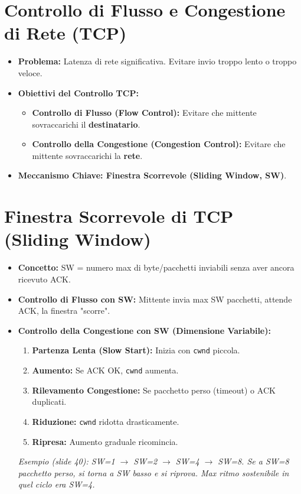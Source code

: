 \documentclass{article}
\begin{document}
\section{Controllo di Flusso e Congestione di Rete (TCP)}
\begin{itemize}
    \item \textbf{Problema:} Latenza di rete significativa. Evitare invio troppo lento o troppo veloce.
    \item \textbf{Obiettivi del Controllo TCP:}
    \begin{itemize}
        \item \textbf{Controllo di Flusso (Flow Control):} Evitare che mittente sovraccarichi il \textbf{destinatario}.
        \item \textbf{Controllo della Congestione (Congestion Control):} Evitare che mittente sovraccarichi la \textbf{rete}.
    \end{itemize}
    \item \textbf{Meccanismo Chiave: Finestra Scorrevole (Sliding Window, SW)}.
\end{itemize}

\section{Finestra Scorrevole di TCP (Sliding Window)}
\begin{itemize}
    \item \textbf{Concetto:} SW = numero max di byte/pacchetti inviabili senza aver ancora ricevuto ACK.
    \item \textbf{Controllo di Flusso con SW:} Mittente invia max SW pacchetti, attende ACK, la finestra "scorre".
    \item \textbf{Controllo della Congestione con SW (Dimensione Variabile):}
    \begin{enumerate}
        \item \textbf{Partenza Lenta (Slow Start):} Inizia con \texttt{cwnd} piccola.
        \item \textbf{Aumento:} Se ACK OK, \texttt{cwnd} aumenta.
        \item \textbf{Rilevamento Congestione:} Se pacchetto perso (timeout) o ACK duplicati.
        \item \textbf{Riduzione:} \texttt{cwnd} ridotta drasticamente.
        \item \textbf{Ripresa:} Aumento graduale ricomincia.
    \end{enumerate}
    \textit{Esempio (slide 40): SW=1 $\rightarrow$ SW=2 $\rightarrow$ SW=4 $\rightarrow$ SW=8. Se a SW=8 pacchetto perso, si torna a SW basso e si riprova. Max ritmo sostenibile in quel ciclo era SW=4.}
\end{itemize}
\end{document}
